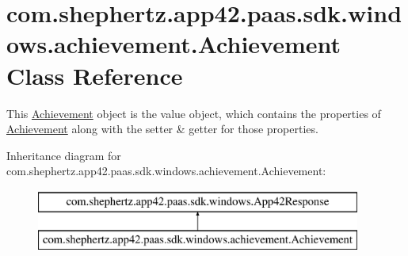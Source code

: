 \hypertarget{classcom_1_1shephertz_1_1app42_1_1paas_1_1sdk_1_1windows_1_1achievement_1_1_achievement}{\section{com.\+shephertz.\+app42.\+paas.\+sdk.\+windows.\+achievement.\+Achievement Class Reference}
\label{classcom_1_1shephertz_1_1app42_1_1paas_1_1sdk_1_1windows_1_1achievement_1_1_achievement}
}


This \hyperlink{classcom_1_1shephertz_1_1app42_1_1paas_1_1sdk_1_1windows_1_1achievement_1_1_achievement}{Achievement} object is the value object, which contains the properties of \hyperlink{classcom_1_1shephertz_1_1app42_1_1paas_1_1sdk_1_1windows_1_1achievement_1_1_achievement}{Achievement} along with the setter \& getter for those properties.  


Inheritance diagram for com.\+shephertz.\+app42.\+paas.\+sdk.\+windows.\+achievement.\+Achievement\+:\begin{figure}[H]
\begin{center}
\leavevmode
\includegraphics[height=2.000000cm]{classcom_1_1shephertz_1_1app42_1_1paas_1_1sdk_1_1windows_1_1achievement_1_1_achievement}
\end{center}
\end{figure}
